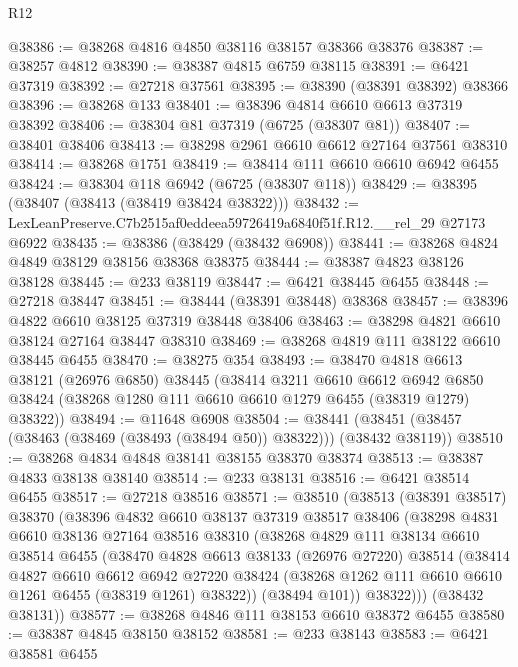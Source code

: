 \begin{lexlean}{R12}
\begin{coremodule}
@38386 := @38268 @4816 @4850 @38116 @38157 @38366 @38376
@38387 := @38257 @4812
@38390 := @38387 @4815 @6759 @38115
@38391 := @6421 @37319
@38392 := @27218 @37561
@38395 := @38390 (@38391 @38392) @38366
@38396 := @38268 @133
@38401 := @38396 @4814 @6610 @6613 @37319 @38392
@38406 := @38304 @81 @37319 (@6725 (@38307 @81))
@38407 := @38401 @38406
@38413 := @38298 @2961 @6610 @6612 @27164 @37561 @38310
@38414 := @38268 @1751
@38419 := @38414 @111 @6610 @6610 @6942 @6455
@38424 := @38304 @118 @6942 (@6725 (@38307 @118))
@38429 := @38395 (@38407 (@38413 (@38419 @38424 @38322)))
@38432 := LexLeanPreserve.C7b2515af0eddeea59726419a6840f51f.R12.__rel_29 @27173 @6922
@38435 := @38386 (@38429 (@38432 @6908))
@38441 := @38268 @4824 @4849 @38129 @38156 @38368 @38375
@38444 := @38387 @4823 @38126 @38128
@38445 := @233 @38119
@38447 := @6421 @38445 @6455
@38448 := @27218 @38447
@38451 := @38444 (@38391 @38448) @38368
@38457 := @38396 @4822 @6610 @38125 @37319 @38448 @38406
@38463 := @38298 @4821 @6610 @38124 @27164 @38447 @38310
@38469 := @38268 @4819 @111 @38122 @6610 @38445 @6455
@38470 := @38275 @354
@38493 := @38470
    @4818
    @6613
    @38121
    (@26976 @6850)
    @38445
    (@38414
      @3211
      @6610
      @6612
      @6942
      @6850
      @38424
      (@38268 @1280 @111 @6610 @6610 @1279 @6455 (@38319 @1279) @38322))
@38494 := @11648 @6908
@38504 := @38441 (@38451 (@38457 (@38463 (@38469 (@38493 (@38494 @50)) @38322))) (@38432 @38119))
@38510 := @38268 @4834 @4848 @38141 @38155 @38370 @38374
@38513 := @38387 @4833 @38138 @38140
@38514 := @233 @38131
@38516 := @6421 @38514 @6455
@38517 := @27218 @38516
@38571 := @38510
    (@38513
      (@38391 @38517)
      @38370
      (@38396
        @4832
        @6610
        @38137
        @37319
        @38517
        @38406
        (@38298
          @4831
          @6610
          @38136
          @27164
          @38516
          @38310
          (@38268
            @4829
            @111
            @38134
            @6610
            @38514
            @6455
            (@38470
              @4828
              @6613
              @38133
              (@26976 @27220)
              @38514
              (@38414
                @4827
                @6610
                @6612
                @6942
                @27220
                @38424
                (@38268 @1262 @111 @6610 @6610 @1261 @6455 (@38319 @1261) @38322))
              (@38494 @101))
            @38322)))
      (@38432 @38131))
@38577 := @38268 @4846 @111 @38153 @6610 @38372 @6455
@38580 := @38387 @4845 @38150 @38152
@38581 := @233 @38143
@38583 := @6421 @38581 @6455

\end{coremodule}
\end{lexlean}
